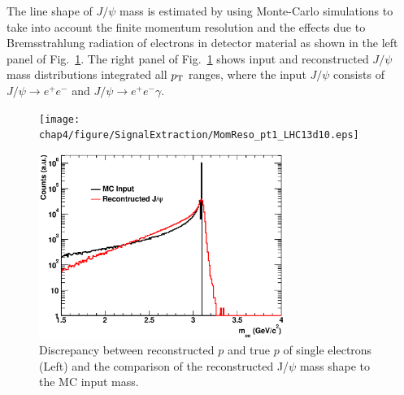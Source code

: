 {The line shape of $J/\psi$  mass is estimated by using Monte-Carlo simulations to take into account the finite momentum resolution and the effects due to Bremsstrahlung radiation of electrons in detector material as shown in the left panel of Fig.~\ref{fig_4_jpsishape}.
The right panel of Fig.~\ref{fig_4_jpsishape} shows input and reconstructed $J/\psi$ mass distributions integrated all $p_{\rm{T}}$ ranges, where the input $J/\psi$ consists of $J/\psi \rightarrow e^{+}e^{-}$ and $J/\psi \rightarrow e^{+}e^{-}\gamma $.
\begin{figure}[htbp]
 \begin{minipage}{0.5\hsize}
  \begin{center}
      \texttt{[image: chap4/figure/SignalExtraction/MomReso\_pt1\_LHC13d10.eps]}
  \end{center}
 \end{minipage}
 \begin{minipage}{0.5\hsize}
  \begin{center}
     \includegraphics[width=8cm]{chap4/figure/SignalExtraction/MCInputandRecMassShape_LHC13d10.eps}	
  \end{center}
 \end{minipage}
  \caption{
   Discrepancy between reconstructed $p$ and true $p$ of single electrons (Left) and the comparison of the reconstructed J/$\psi$ mass shape to the MC input mass.
   }
  \label{fig_4_jpsishape}
\end{figure}


}
